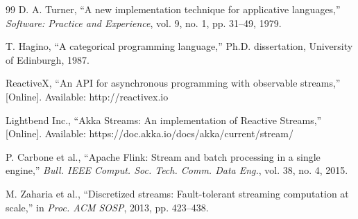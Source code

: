 \documentclass[10pt,conference]{IEEEtran}
\begin{document}
\begin{thebibliography}{99}
D. A. Turner, ``A new implementation technique for applicative languages,'' \emph{Software: Practice and Experience}, vol. 9, no. 1, pp. 31--49, 1979.

T. Hagino, ``A categorical programming language,'' Ph.D. dissertation, University of Edinburgh, 1987.

ReactiveX, ``An API for asynchronous programming with observable streams,'' [Online]. Available: http://reactivex.io

Lightbend Inc., ``Akka Streams: An implementation of Reactive Streams,'' [Online]. Available: https://doc.akka.io/docs/akka/current/stream/

P. Carbone et al., ``Apache Flink: Stream and batch processing in a single engine,'' \emph{Bull. IEEE Comput. Soc. Tech. Comm. Data Eng.}, vol. 38, no. 4, 2015.

M. Zaharia et al., ``Discretized streams: Fault-tolerant streaming computation at scale,'' in \emph{Proc. ACM SOSP}, 2013, pp. 423--438.

\end{thebibliography}
\end{document}
